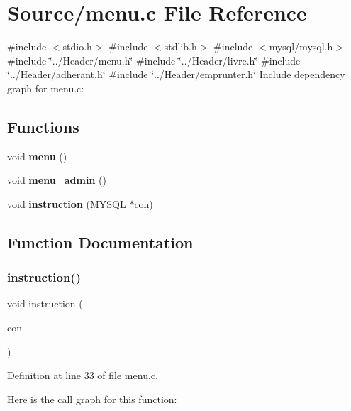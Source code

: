 \section{Source/menu.c File Reference}
\label{menu_8c}
{\ttfamily \#include $<$stdio.\+h$>$}\newline
{\ttfamily \#include $<$stdlib.\+h$>$}\newline
{\ttfamily \#include $<$mysql/mysql.\+h$>$}\newline
{\ttfamily \#include \char`\"{}../\+Header/menu.\+h\char`\"{}}\newline
{\ttfamily \#include \char`\"{}../\+Header/livre.\+h\char`\"{}}\newline
{\ttfamily \#include \char`\"{}../\+Header/adherant.\+h\char`\"{}}\newline
{\ttfamily \#include \char`\"{}../\+Header/emprunter.\+h\char`\"{}}\newline
Include dependency graph for menu.\+c\+:
\subsection*{Functions}
\begin{DoxyCompactItemize}
\item 
void \textbf{ menu} ()
\item 
void \textbf{ menu\+\_\+admin} ()
\item 
void \textbf{ instruction} (M\+Y\+S\+QL $\ast$con)
\end{DoxyCompactItemize}


\subsection{Function Documentation}
\mbox{\label{menu_8c_a7b27fa1cd88be135a242f9c137dd745e}} 
\subsubsection{instruction()}
{\footnotesize\ttfamily void instruction (\begin{DoxyParamCaption}\item[{M\+Y\+S\+QL $\ast$}]{con }\end{DoxyParamCaption})}



Definition at line 33 of file menu.\+c.

Here is the call graph for this function\+:
\mbox{\label{menu_8c_a2a0e843767aeea4f433a28b9c54f573a}} 
